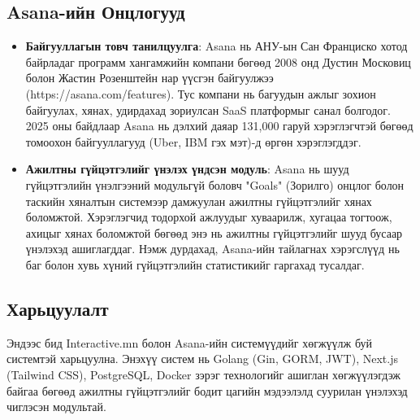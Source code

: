 \subsection{Asana-ийн Онцлогууд}
\begin{itemize}
    \item \textbf{Байгууллагын товч танилцуулга}: Asana нь АНУ-ын Сан Франциско хотод байрладаг программ хангамжийн компани бөгөөд 2008 онд Дустин Московиц болон Жастин Розенштейн нар үүсгэн байгуулжээ (https://asana.com/features). Тус компани нь багуудын ажлыг зохион байгуулах, хянах, удирдахад зориулсан SaaS платформыг санал болгодог. 2025 оны байдлаар Asana нь дэлхий даяар 131,000 гаруй хэрэглэгчтэй бөгөөд томоохон байгууллагууд (Uber, IBM гэх мэт)-д өргөн хэрэглэгддэг.
    \item \textbf{Ажилтны гүйцэтгэлийг үнэлэх үндсэн модуль}: Asana нь шууд гүйцэтгэлийн үнэлгээний модульгүй боловч "Goals" (Зорилго) онцлог болон таскийн хяналтын системээр дамжуулан ажилтны гүйцэтгэлийг хянах боломжтой. Хэрэглэгчид тодорхой ажлуудыг хуваарилж, хугацаа тогтоож, ахицыг хянах боломжтой бөгөөд энэ нь ажилтны гүйцэтгэлийг шууд бусаар үнэлэхэд ашиглагддаг. Нэмж дурдахад, Asana-ийн тайлагнах хэрэгслүүд нь баг болон хувь хүний гүйцэтгэлийн статистикийг гаргахад тусалдаг.
\end{itemize}

\subsection{Харьцуулалт}
Эндээс бид Interactive.mn болон Asana-ийн системүүдийг хөгжүүлж буй системтэй харьцуулна. Энэхүү систем нь Golang (Gin, GORM, JWT), Next.js (Tailwind CSS), PostgreSQL, Docker зэрэг технологийг ашиглан хөгжүүлэгдэж байгаа бөгөөд ажилтны гүйцэтгэлийг бодит цагийн мэдээлэлд суурилан үнэлэхэд чиглэсэн модультай.


